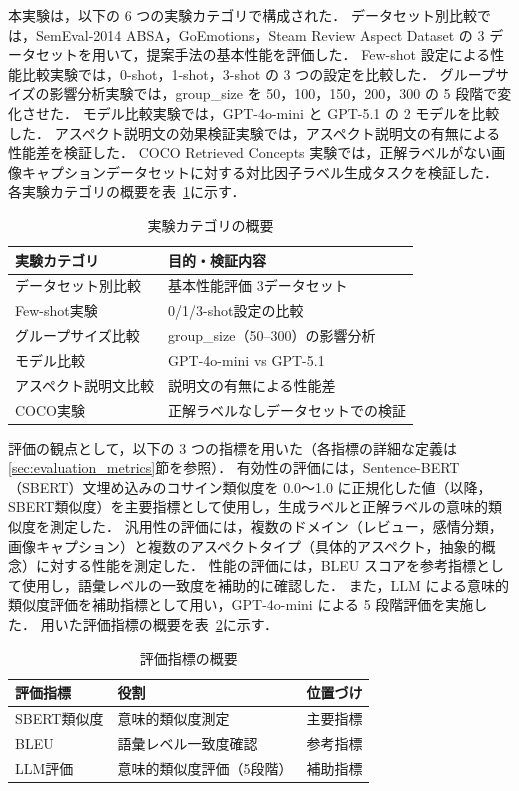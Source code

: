 本実験は，以下の 6 つの実験カテゴリで構成された．
データセット別比較では，SemEval-2014 ABSA，GoEmotions，Steam Review Aspect Dataset の 3 データセットを用いて，提案手法の基本性能を評価した．
Few-shot 設定による性能比較実験では，0-shot，1-shot，3-shot の 3 つの設定を比較した．
グループサイズの影響分析実験では，group\_size を 50，100，150，200，300 の 5 段階で変化させた．
モデル比較実験では，GPT-4o-mini と GPT-5.1 の 2 モデルを比較した．
アスペクト説明文の効果検証実験では，アスペクト説明文の有無による性能差を検証した．
COCO Retrieved Concepts 実験では，正解ラベルがない画像キャプションデータセットに対する対比因子ラベル生成タスクを検証した．
各実験カテゴリの概要を表~\ref{tab:experiment_overview}に示す．
\begin{table}[htbp]
  \centering
  \caption{実験カテゴリの概要}
  \label{tab:experiment_overview}
  \begin{tabular}{ll}
    \toprule
    実験カテゴリ & 目的・検証内容 \\
    \midrule
    データセット別比較 & 基本性能評価 3データセット \\
    Few-shot実験 & 0/1/3-shot設定の比較 \\
    グループサイズ比較 & group\_size（50--300）の影響分析 \\
    モデル比較 & GPT-4o-mini vs GPT-5.1 \\
    アスペクト説明文比較 & 説明文の有無による性能差 \\
    COCO実験 & 正解ラベルなしデータセットでの検証 \\
    \bottomrule
  \end{tabular}
\end{table}

評価の観点として，以下の 3 つの指標を用いた（各指標の詳細な定義は\ref{sec:evaluation_metrics}節を参照）．
有効性の評価には，Sentence-BERT（SBERT）文埋め込みのコサイン類似度を 0.0〜1.0 に正規化した値（以降，SBERT類似度）を主要指標として使用し，生成ラベルと正解ラベルの意味的類似度を測定した．
汎用性の評価には，複数のドメイン（レビュー，感情分類，画像キャプション）と複数のアスペクトタイプ（具体的アスペクト，抽象的概念）に対する性能を測定した．
性能の評価には，BLEU スコアを参考指標として使用し，語彙レベルの一致度を補助的に確認した．
また，LLM による意味的類似度評価を補助指標として用い，GPT-4o-mini による 5 段階評価を実施した．
用いた評価指標の概要を表~\ref{tab:evaluation_metrics_overview}に示す．
\begin{table}[htbp]
  \centering
  \caption{評価指標の概要}
  \label{tab:evaluation_metrics_overview}
  \begin{tabular}{lll}
    \toprule
    評価指標 & 役割 & 位置づけ \\
    \midrule
    SBERT類似度 & 意味的類似度測定 & 主要指標 \\
    BLEU & 語彙レベル一致度確認 & 参考指標 \\
    LLM評価 & 意味的類似度評価（5段階） & 補助指標 \\
    \bottomrule
  \end{tabular}
\end{table}

